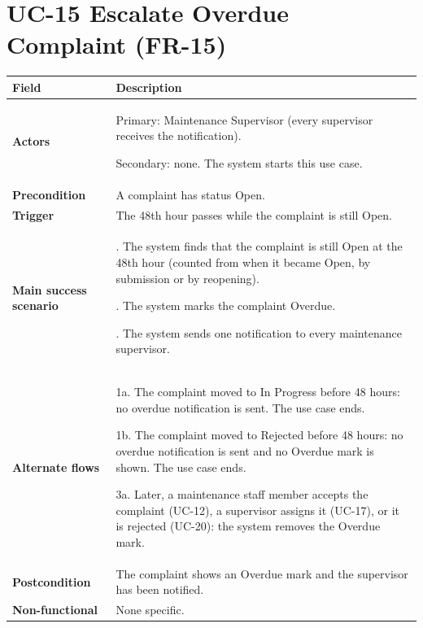 \documentclass[11pt,a4paper]{report}
\begin{document}
\section{UC-15 Escalate Overdue Complaint (FR-15)}
\begin{longtable}{|>{\raggedright\arraybackslash}p{3.0cm}|>{\raggedright\arraybackslash}p{12.4cm}|}
\hline \textbf{Field} & \textbf{Description} \\ \hline \endhead
\textbf{Actors} & Primary: Maintenance Supervisor (every supervisor receives the notification).\par\smallskip Secondary: none. The system starts this use case. \\ \hline
\textbf{Precondition} & A complaint has status Open. \\ \hline
\textbf{Trigger} & The 48th hour passes while the complaint is still Open. \\ \hline
\textbf{Main success scenario} & 1. The system finds that the complaint is still Open at the 48th hour (counted from when it became Open, by submission or by reopening).\par\smallskip 2. The system marks the complaint Overdue.\par\smallskip 3. The system sends one notification to every maintenance supervisor. \\ \hline
\textbf{Alternate flows} & 1a. The complaint moved to In Progress before 48 hours: no overdue notification is sent. The use case ends.\par\smallskip 1b. The complaint moved to Rejected before 48 hours: no overdue notification is sent and no Overdue mark is shown. The use case ends.\par\smallskip 3a. Later, a maintenance staff member accepts the complaint (UC-12), a supervisor assigns it (UC-17), or it is rejected (UC-20): the system removes the Overdue mark. \\ \hline
\textbf{Postcondition} & The complaint shows an Overdue mark and the supervisor has been notified. \\ \hline
\textbf{Non-functional} & None specific. \\ \hline
\end{longtable}
\end{document}
